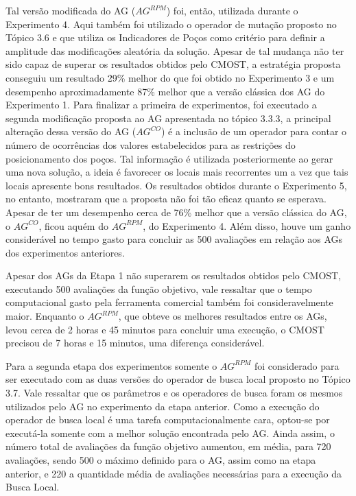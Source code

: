Tal versão modificada do AG ($AG^{RPM}$) foi, então, utilizada durante o Experimento 4. Aqui também foi utilizado o operador de mutação proposto no Tópico 3.6 e que utiliza os Indicadores de Poços como critério para definir a amplitude das modificações aleatória da solução. Apesar de tal mudança não ter sido capaz de superar os resultados obtidos pelo CMOST, a estratégia proposta conseguiu um resultado 29\% melhor do que foi obtido no Experimento 3 e um desempenho aproximadamente 87\% melhor que a versão clássica dos AG do Experimento 1. Para finalizar a primeira de experimentos, foi executado a segunda modificação proposta ao AG apresentada no tópico 3.3.3, a principal alteração dessa versão do AG ($AG^{CO}$) é a inclusão de um operador para contar o número de ocorrências dos valores estabelecidos para as restrições do posicionamento dos poços. Tal informação é utilizada posteriormente ao gerar uma nova solução, a ideia é favorecer os locais mais recorrentes um a vez que tais locais apresente bons resultados. Os resultados obtidos durante o Experimento 5, no entanto, mostraram que a proposta não foi tão eficaz quanto se esperava. Apesar de ter um desempenho cerca de 76\% melhor que a versão clássica do AG, o $AG^{CO}$, ficou aquém do $AG^{RPM}$, do Experimento 4. Além disso, houve um ganho considerável no tempo gasto para concluir as 500 avaliações em relação aos AGs dos experimentos anteriores.

Apesar dos AGs da Etapa 1 não superarem os resultados obtidos pelo CMOST, executando 500 avaliações da função objetivo, vale ressaltar que o tempo computacional gasto pela ferramenta comercial também foi consideravelmente maior. Enquanto o $AG^{RPM}$, que obteve os melhores resultados entre os AGs, levou cerca de 2 horas e 45 minutos para concluir uma execução, o CMOST precisou de 7 horas e 15 minutos, uma diferença considerável.

Para a segunda etapa dos experimentos somente o $AG^{RPM}$ foi considerado para ser executado com as duas versões do operador de busca local proposto no Tópico 3.7. Vale ressaltar que os parâmetros e os operadores de busca foram os mesmos utilizados pelo AG no experimento da etapa anterior. Como a execução do operador de busca local é uma tarefa computacionalmente cara, optou-se por executá-la somente com a melhor solução encontrada pelo AG. Ainda assim, o número total de avaliações da função objetivo aumentou, em média, para 720 avaliações, sendo 500 o máximo definido para o AG, assim como na etapa anterior, e 220 a quantidade média de avaliações necessárias para a execução da Busca Local.

